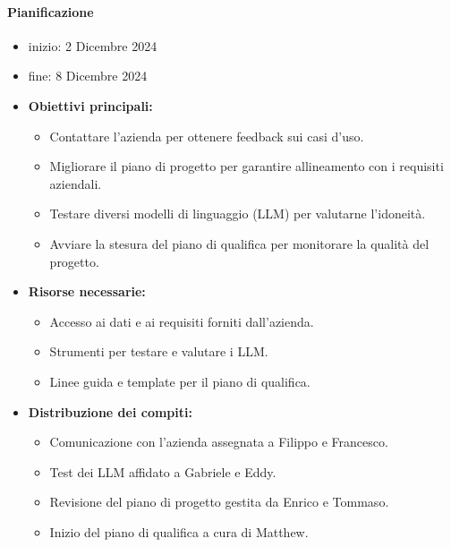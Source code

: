 \documentclass{article}
\begin{document}
                \paragraph{Pianificazione}
                \begin{itemize}
                    \item inizio: 2 Dicembre 2024
                    \item fine: 8 Dicembre 2024
                \end{itemize}
                \begin{itemize}
                    \item \textbf{Obiettivi principali:}
                    \begin{itemize}
                        \item Contattare l'azienda per ottenere feedback sui casi d'uso.
                        \item Migliorare il piano di progetto per garantire allineamento con i requisiti aziendali.
                        \item Testare diversi modelli di linguaggio (LLM) per valutarne l'idoneità.
                        \item Avviare la stesura del piano di qualifica per monitorare la qualità del progetto.
                    \end{itemize}
                    \item \textbf{Risorse necessarie:}
                    \begin{itemize}
                        \item Accesso ai dati e ai requisiti forniti dall'azienda.
                        \item Strumenti per testare e valutare i LLM.
                        \item Linee guida e template per il piano di qualifica.
                    \end{itemize}
                    \item \textbf{Distribuzione dei compiti:}
                    \begin{itemize}
                        \item Comunicazione con l'azienda assegnata a Filippo e Francesco.
                        \item Test dei LLM affidato a Gabriele e Eddy.
                        \item Revisione del piano di progetto gestita da Enrico e Tommaso.
                        \item Inizio del piano di qualifica a cura di Matthew.
                    \end{itemize}
                \end{itemize}
\end{document}
